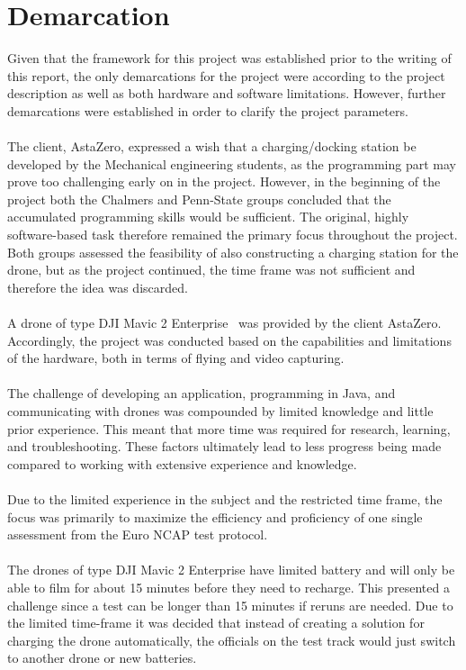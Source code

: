 \section{Demarcation} \label{chap:demarcation}
Given that the framework for this project was established prior to the writing of this report, the only demarcations for the project were according to the project description as well as both hardware and software limitations. However, further demarcations were established in order to clarify the project parameters. 
\\ \\
The client, AstaZero, expressed a wish that a charging/docking station be developed by the Mechanical engineering students, as the programming part may prove too challenging early on in the project. However, in the beginning of the project both the Chalmers and Penn-State groups concluded that the accumulated programming skills would be sufficient. The original, highly software-based task therefore remained the primary focus throughout the project.
Both groups assessed the feasibility of also constructing a charging station for the drone, but as the project continued, the time frame was not sufficient and therefore the idea was discarded. 
\\ \\
A drone of type DJI Mavic 2 Enterprise~\cite{DJI2018MavicDJI} was provided by the client AstaZero. Accordingly, the project was conducted based on the capabilities and limitations of the hardware, both in terms of flying and video capturing. 
\\ \\
The challenge of developing an application, programming in Java, and communicating with drones was compounded by limited knowledge and little prior experience. This meant that more time was required for research, learning, and troubleshooting. These factors ultimately lead to less progress being made compared to working with extensive experience and knowledge.
\\ \\
Due to the limited experience in the subject and the restricted time frame, the focus was primarily to maximize the efficiency and proficiency of one single assessment from the Euro NCAP test protocol. 
\\ \\
The drones of type DJI Mavic 2 Enterprise  have limited battery and will only be able to film for about 15 minutes before they need to recharge. This presented a challenge since a test can be longer than 15 minutes if reruns are needed. Due to the limited time-frame it was decided that instead of creating a solution for charging the drone automatically, the officials on the test track would just switch to another drone or new batteries.
